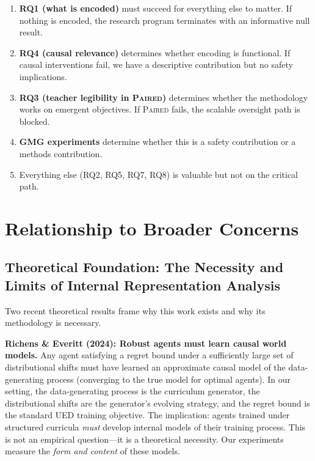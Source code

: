 \documentclass[11pt,a4paper]{article}
\theoremstyle{remark}
\newcommand{\paired}{\textsc{Paired}}
\begin{document}
\begin{enumerate}[nosep]
    \item \textbf{RQ1 (what is encoded)} must succeed for everything else to matter. If nothing is encoded, the research program terminates with an informative null result.
    \item \textbf{RQ4 (causal relevance)} determines whether encoding is functional. If causal interventions fail, we have a descriptive contribution but no safety implications.
    \item \textbf{RQ3 (teacher legibility in \paired{})} determines whether the methodology works on emergent objectives. If \paired{} fails, the scalable oversight path is blocked.
    \item \textbf{GMG experiments} determine whether this is a safety contribution or a methods contribution.
    \item Everything else (RQ2, RQ5, RQ7, RQ8) is valuable but not on the critical path.
\end{enumerate}


\section{Relationship to Broader Concerns}
\label{sec:broader}

\subsection{Theoretical Foundation: The Necessity and Limits of Internal Representation Analysis}

Two recent theoretical results frame why this work exists and why its methodology is necessary.

\textbf{Richens \& Everitt (2024): Robust agents must learn causal world models.} Any agent satisfying a regret bound under a sufficiently large set of distributional shifts must have learned an approximate causal model of the data-generating process (converging to the true model for optimal agents). In our setting, the data-generating process is the curriculum generator, the distributional shifts are the generator's evolving strategy, and the regret bound is the standard UED training objective. The implication: agents trained under structured curricula \textit{must} develop internal models of their training process. This is not an empirical question---it is a theoretical necessity. Our experiments measure the \textit{form and content} of these models.
\end{document}
